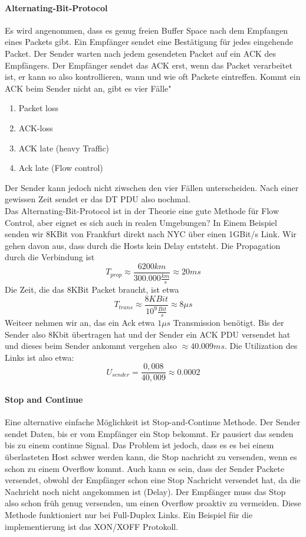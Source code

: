 		\paragraph{Alternating-Bit-Protocol}
			Es wird angenommen, dass es genug freien Buffer Space nach dem Empfangen eines Packets gibt. Ein Empfänger sendet eine Bestätigung für jedes eingehende Packet. Der Sender warten nach jedem gesendeten Packet auf ein ACK des Empfängers. Der Empfänger sendet das ACK erst, wenn das Packet verarbeitet ist, er kann so also kontrollieren, wann und wie oft Packete eintreffen. Kommt ein ACK beim Sender nicht an, gibt es vier Fälle"
			\begin{enumerate}
				\item Packet loss
				\item ACK-loss
				\item ACK late (heavy Traffic)
				\item Ack late (Flow control)
			\end{enumerate}
			Der Sender kann jedoch nicht ziwschen den vier Fällen unterscheiden. Nach einer gewissen Zeit sendet er das DT PDU also nochmal. \\
			Das Alternating-Bit-Protocol ist in der Theorie eine gute Methode für Flow Control, aber eignet es sich auch in realen Umgebungen? In Einem Beispiel senden wir 8KBit von Frankfurt direkt nach NYC über einen 1GBit/s Link. Wir gehen davon aus, dass durch die Hosts kein Delay entsteht. Die Propagation durch die Verbindung ist
			$$
				T_{prop} \approx \frac{6200km}{300.000\frac{km}{s}} \approx 20ms
			$$ 
			Die Zeit, die das 8KBit Packet braucht, ist etwa
			$$
				T_{trans} \approx \frac{8KBit}{10^9\frac{Bit}{s}} \approx 8\mu s
			$$ 
			Weiteer nehmen wir an, das ein Ack etwa $1\mu s$ Transmission benötigt. Bis der Sender also 8Kbit übertragen hat und der Sender ein ACK PDU versendet hat und dieses beim Sender ankommt vergehen also $\approx 40.009ms$. Die Utilization des Links ist also etwa:
			$$
				U_{sender} = \frac{0,008}{40,009} \approx 0.0002
			$$
		
		\paragraph{Stop and Continue}
			Eine alternative einfache Möglichkeit ist Stop-and-Continue Methode. Der Sender sendet Daten, bis er vom Empfänger ein Stop bekommt. Er pausiert das senden bis zu einem continue Signal. Das Problem ist jedoch, dass es es bei einem überlasteten Host schwer werden kann, die Stop nachricht zu versenden, wenn es schon zu einem Overflow kommt. Auch kann es sein, dass der Sender Packete versendet, obwohl der Empfänger schon eine Stop Nachricht versendet hat, da die Nachricht noch nicht angekommen ist (Delay). Der Empfänger muss das Stop also schon früh genug versenden, um einen Overflow proaktiv zu vermeiden. Diese Methode funktioniert nur bei Full-Duplex Links. Ein Beispiel für die implementierung ist das XON/XOFF Protokoll.

